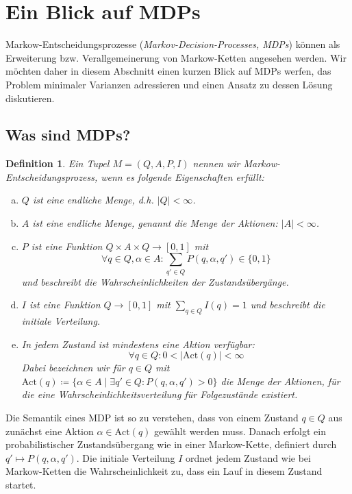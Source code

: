 \documentclass[a4paper]{article}
\newcommand{\mc}{Markow-Kette}
\newtheorem{definition}[satz]{Definition} %
\theoremstyle{nonumberplain}
\begin{document}
\section{Ein Blick auf MDPs}

Markow-Entscheidungsprozesse (\textit{Markov-Decision-Processes, MDPs}) können als Erweiterung bzw. Verallgemeinerung von \mc{}n angesehen werden. Wir möchten daher in diesem Abschnitt einen kurzen Blick auf MDPs werfen, das Problem minimaler Varianzen adressieren und einen Ansatz zu dessen Lösung diskutieren.

\subsection{Was sind MDPs?}
\newcommand{\mdpex}{$M = (Q,A,P,I)$}
\newcommand{\mdp}{Mar\-kow-Ent\-schei\-dungs\-pro\-zess}
\newcommand{\mact}{\mathrm{Act}}
\begin{definition}\label{def-mdp}
	Ein Tupel \mdpex{} nennen wir \mdp{}, wenn es folgende Eigenschaften erfüllt:
	\begin{enumerate}[(a)]
		\item $Q$ ist eine endliche Menge, d.h. $|Q|<\infty$.
		\item $A$ ist eine endliche Menge, genannt die Menge der Aktionen: $|A| < \infty$.
		\item $P$ ist eine Funktion $Q \times A \times Q \to [0,1]$ mit
		\begin{equation}
		\forall q\in Q, \alpha\in A : \sum_{q' \in Q}{P(q,\alpha,q')} \in \{0,1\}
		\end{equation}
		und beschreibt die Wahrscheinlichkeiten der Zustandsübergänge.
		\item $I$ ist eine Funktion $Q \to [0,1]$ mit $\sum_{q \in Q}{I(q)} = 1$ und beschreibt die initiale Verteilung.
		\item In jedem Zustand ist mindestens eine Aktion verfügbar:
		\begin{equation}
			\forall q\in Q : 0 < | \mathrm{Act}(q) | < \infty
		\end{equation}
		Dabei bezeichnen wir für $q \in Q$ mit $\mathrm{Act}(q) \coloneqq \{\alpha \in A \mid \exists q' \in Q : P(q,\alpha,q') > 0\}$ die Menge der Aktionen, für die eine Wahrscheinlichkeitsverteilung für Folgezustände existiert. \label{item-b-270820}
	\end{enumerate}
\end{definition}	
Die Semantik eines MDP ist so zu verstehen, dass von einem Zustand $q \in Q$ aus zunächst eine Aktion $\alpha \in \mathrm{Act}(q)$ gewählt werden muss. Danach erfolgt ein probabilistischer Zustandsübergang wie in einer \mc{}, definiert durch $q' \mapsto P(q,\alpha,q')$. Die initiale Verteilung $I$ ordnet jedem Zustand wie bei \mc{}n die Wahrscheinlichkeit zu, dass ein Lauf in diesem Zustand startet.
\end{document}
